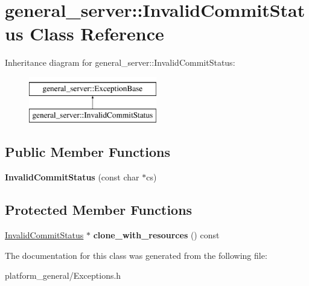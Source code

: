 \hypertarget{classgeneral__server_1_1InvalidCommitStatus}{\section{general\-\_\-server\-:\-:\-Invalid\-Commit\-Status \-Class \-Reference}
\label{classgeneral__server_1_1InvalidCommitStatus}
}
\-Inheritance diagram for general\-\_\-server\-:\-:\-Invalid\-Commit\-Status\-:\begin{figure}[H]
\begin{center}
\leavevmode
\includegraphics[height=2.000000cm]{classgeneral__server_1_1InvalidCommitStatus}
\end{center}
\end{figure}
\subsection*{\-Public \-Member \-Functions}
\begin{DoxyCompactItemize}
\item 
\hypertarget{classgeneral__server_1_1InvalidCommitStatus_a863107354f0ba4d619616b0998ab982b}{{\bfseries \-Invalid\-Commit\-Status} (const char $\ast$cs)}\label{classgeneral__server_1_1InvalidCommitStatus_a863107354f0ba4d619616b0998ab982b}

\end{DoxyCompactItemize}
\subsection*{\-Protected \-Member \-Functions}
\begin{DoxyCompactItemize}
\item 
\hypertarget{classgeneral__server_1_1InvalidCommitStatus_a1e4cc5e9cdba8c2d069b76a751e929d3}{\hyperlink{classgeneral__server_1_1InvalidCommitStatus}{\-Invalid\-Commit\-Status} $\ast$ {\bfseries clone\-\_\-with\-\_\-resources} () const }\label{classgeneral__server_1_1InvalidCommitStatus_a1e4cc5e9cdba8c2d069b76a751e929d3}

\end{DoxyCompactItemize}


\-The documentation for this class was generated from the following file\-:\begin{DoxyCompactItemize}
\item 
platform\-\_\-general/\-Exceptions.\-h\end{DoxyCompactItemize}
